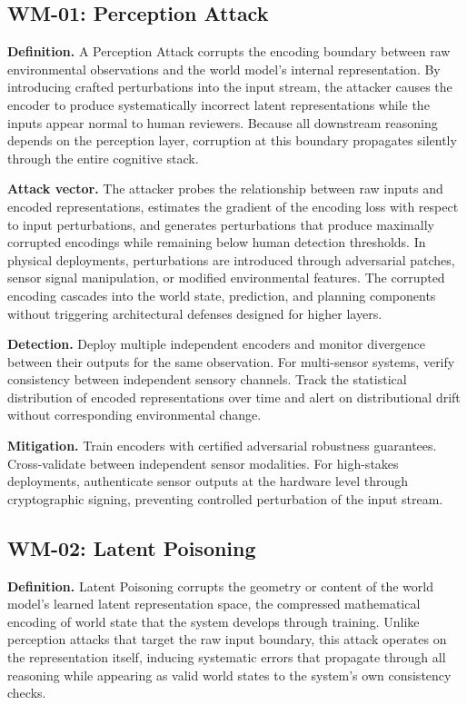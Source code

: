 \documentclass[11pt,a4paper]{article}
\begin{document}
\subsection{WM-01: Perception Attack}

\textbf{Definition.} A Perception Attack corrupts the encoding boundary between raw environmental observations and the world model's internal representation. By introducing crafted perturbations into the input stream, the attacker causes the encoder to produce systematically incorrect latent representations while the inputs appear normal to human reviewers. Because all downstream reasoning depends on the perception layer, corruption at this boundary propagates silently through the entire cognitive stack.

\textbf{Attack vector.} The attacker probes the relationship between raw inputs and encoded representations, estimates the gradient of the encoding loss with respect to input perturbations, and generates perturbations that produce maximally corrupted encodings while remaining below human detection thresholds. In physical deployments, perturbations are introduced through adversarial patches, sensor signal manipulation, or modified environmental features. The corrupted encoding cascades into the world state, prediction, and planning components without triggering architectural defenses designed for higher layers.

\textbf{Detection.} Deploy multiple independent encoders and monitor divergence between their outputs for the same observation. For multi-sensor systems, verify consistency between independent sensory channels. Track the statistical distribution of encoded representations over time and alert on distributional drift without corresponding environmental change.

\textbf{Mitigation.} Train encoders with certified adversarial robustness guarantees. Cross-validate between independent sensor modalities. For high-stakes deployments, authenticate sensor outputs at the hardware level through cryptographic signing, preventing controlled perturbation of the input stream.

\subsection{WM-02: Latent Poisoning}

\textbf{Definition.} Latent Poisoning corrupts the geometry or content of the world model's learned latent representation space, the compressed mathematical encoding of world state that the system develops through training. Unlike perception attacks that target the raw input boundary, this attack operates on the representation itself, inducing systematic errors that propagate through all reasoning while appearing as valid world states to the system's own consistency checks.
\end{document}

